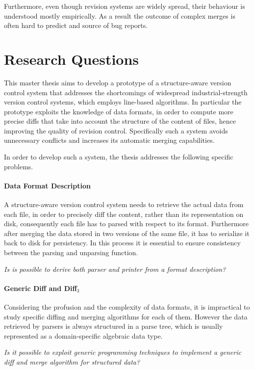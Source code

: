 \documentclass[../Thesis.tex]{subfiles}
\begin{document}
	Furthermore, even though revision systems are widely spread, their
	behaviour is understood mostly empirically.
	As a result the outcome of complex merges is often hard to predict
	and source of bug reports.

\section{Research Questions}
This master thesis aims to develop a prototype of a structure-aware
version control system that addresses the shortcomings of widespread 
industrial-strength version control systems, which employs 
line-based algorithms.
In particular the prototype exploits the knowledge of data formats,
in order to compute more precise diffs that take into account the structure 
of the content of files, hence improving the quality of revision control.
Specifically such a system avoids unnecessary conflicts and increases
its automatic merging capabilities. 

In order to develop such a system, the thesis addresses the following specific problems.

\paragraph{Data Format Description}
A structure-aware version control system needs to retrieve the 
actual data from each file, in order to precisely diff the content, rather
than its representation on disk, consequently each file has to parsed
 with respect to its format. Furthermore after merging the data stored in two
versions of the same file, it has to serialize it back to disk for persistency.
In this process it is essential to ensure consistency between the parsing and unparsing function.

\emph{Is is possible to derive both parser and printer from a format
description?}

\paragraph{Generic Diff and Diff$_3$}
Considering the profusion and the complexity of data formats, it is impractical
to study specific diffing and merging algorithms for each of them.
However the data retrieved by parsers is always structured in a parse tree,
which is usually represented as a domain-specific algebraic data type.

\emph{Is it possible to exploit generic programming techniques
to implement a generic diff and merge algorithm for structured data?}
\end{document}
